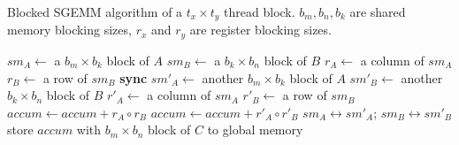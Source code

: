 \begin{algorithm}
  \caption{ Blocked SGEMM algorithm of a $t_x \times t_y$ thread block. $b_m, b_n, b_k$ are shared memory blocking sizes, $r_x$ and $r_y$ are register blocking sizes.}
  \label{gemm}
  {\footnotesize
  \begin{algorithmic}[1]
	\State $sm_A \gets$ a $b_m \times b_k$ block of $A$
	\State $sm_B \gets$ a $b_k \times b_n$ block of $B$
    \State $r_A \gets $ a column of $sm_A$%
    \State $r_B \gets $ a row of $sm_B$%
	\Do
	\State \textbf{sync}
	\State $sm'_A \gets$ another $b_m \times b_k$ block of $A$
	\State $sm'_B \gets$ another $b_k \times b_n$ block of $B$
		\State $r'_A \gets$ a column of $sm_A$ %
		\State $r'_B \gets$ a row of $sm_B$%
        \State $accum \gets accum + r_A \circ r_B$
        \Else
        \State $accum \gets accum + r'_A \circ r'_B$
        \EndIf
	\EndFor
      \State $sm_A \leftrightarrow sm'_A$; $sm_B \leftrightarrow sm'_B$ 
      \State store $accum$ with $b_m \times b_n$ block of $C$ to global memory %
  \end{algorithmic}
  }
\end{algorithm}


